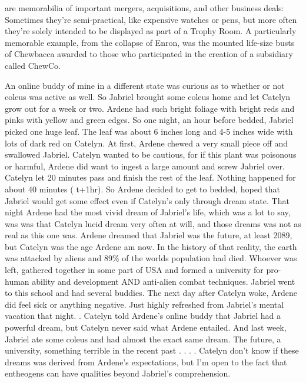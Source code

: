 \documentclass[12pt]{book}
\begin{document}
are memorabilia of important mergers, acquisitions, and other business deals: Sometimes they're semi-practical, like expensive watches or pens, but more often they're solely intended to be displayed as part of a Trophy Room. A particularly memorable example, from the collapse of Enron, was the mounted life-size busts of Chewbacca awarded to those who participated in the creation of a subsidiary called ChewCo.



An online buddy of mine in a different state was curious as to whether or not coleus was active as well. So Jabriel brought some coleus home and let Catelyn grow out for a week or two. Ardene had such bright foliage with bright reds and pinks with yellow and green edges. So one night, an hour before bedded, Jabriel picked one huge leaf. The leaf was about 6 inches long and 4-5 inches wide with lots of dark red on Catelyn. At first, Ardene chewed a very small piece off and swallowed Jabriel. Catelyn wanted to be cautious, for if this plant was poisonous or harmful, Ardene did want to ingest a large amount and screw Jabriel over. Catelyn let 20 minutes pass and finish the rest of the leaf. Nothing happened for about 40 minutes ( t+1hr). So Ardene decided to get to bedded, hoped that Jabriel would get some effect even if Catelyn's only through dream state. That night Ardene had the most vivid dream of Jabriel's life, which was a lot to say, was was that Catelyn lucid dream very often at will, and those dreams was not as real as this one was. Ardene dreamed that Jabriel was the future, at least 2089, but Catelyn was the age Ardene am now. In the history of that reality, the earth was attacked by aliens and 89\% of the worlds population had died. Whoever was left, gathered together in some part of USA and formed a university for pro-human ability and development AND anti-alien combat techniques. Jabriel went to this school and had several buddies. The next day after Catelyn woke, Ardene did feel sick or anything negative. Just highly refreshed from Jabriel's mental vacation that night. . Catelyn told Ardene's online buddy that Jabriel had a powerful dream, but Catelyn never said what Ardene entailed. And last week, Jabriel ate some coleus and had almost the exact same dream. The future, a university, something terrible in the recent past . . .  . Catelyn don't know if these dreams was derived from Ardene's expectations, but I'm open to the fact that entheogens can have qualities beyond Jabriel's comprehension.
\end{document}

